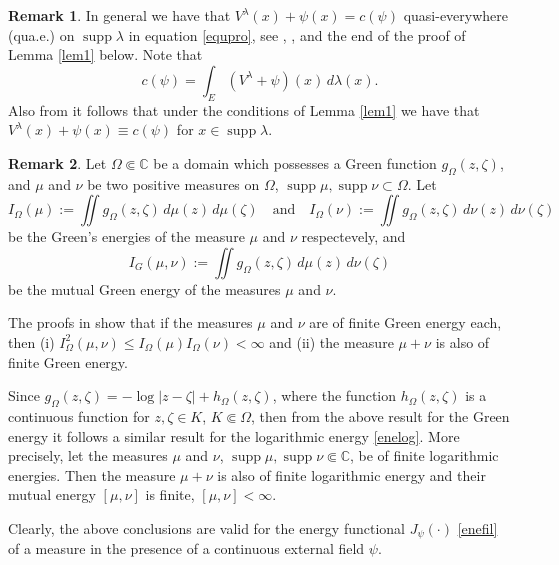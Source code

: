 \documentclass[11pt, a4paper, twoside]{article}
\let\leq\leqslant
\def\CC{\mathbb C}
\def\supp{\operatorname{supp}}
\theoremstyle{plain}
\theoremstyle{definition}
\newtheorem{remark}{Remark}
\begin{document}
\begin{remark}\label{rem21}
In general we have that $V^\lambda(x)+\psi(x)=c(\psi)$ quasi-everywhere (qua.e.) on $\supp{\lambda}$ in equation \eqref{equpro}, see \cite[Chapter 2, \S 4]{Lan66}, \cite[Chapter 5, Section 3]{NiSo88}, \cite[Chapter I, Section I.1]{SaTo97} and  the end of the proof of Lemma \ref{lem1} below.
Note that
\begin{equation}
c(\psi)=\int_E(V^\lambda+\psi)(x)\,d\lambda(x).
\label{cpsifo}
\end{equation}
Also from \cite[Theorem 4.1]{NiSo88} it follows that under the conditions of Lemma \ref{lem1} we have that $V^{\lambda}(x)+\psi(x)\equiv c(\psi)$ for $x\in\supp{\lambda}$.
\end{remark}

\begin{remark}\label{rem22}
Let $\Omega\Subset\CC$ be a domain which possesses a Green function $g_\Omega(z,\zeta)$,
and $\mu$ and $\nu$ be two positive measures on $\Omega$, $\supp{\mu},\supp{\nu}\subset \Omega$. Let 
\begin{equation}
I_\Omega(\mu):=\iint g_\Omega(z,\zeta)\,d\mu(z)\,d\mu(\zeta)\quad
\text{and}\quad 
I_\Omega(\nu):=\iint g_\Omega(z,\zeta)\,d\nu(z)\,d\nu(\zeta)
\label{greenin}
\end{equation}
be the Green's energies of the measure $\mu$ and $\nu$ respectevely, and
\begin{equation}
I_G(\mu,\nu):=\iint  g_\Omega(z,\zeta)\,d\mu(z)\,d\nu(\zeta)
\label{greenmu}
\end{equation}
be the mutual Green energy of the measures $\mu$ and $\nu$. 

The proofs in \cite[Chapter II, Section 5, Lemma 5.4]{SaTo97} show that if the measures $\mu$ and $\nu$ are of finite Green energy each, then (i) $I^2_\Omega(\mu,\nu)\leq I_\Omega(\mu)I_\Omega(\nu)<\infty$  and (ii) the measure $\mu+\nu$ is also of finite Green energy.

Since $g_\Omega(z,\zeta)=-\log|z-\zeta|+h_\Omega(z,\zeta)$, where the function $h_\Omega(z,\zeta)$ is  a continuous function for $z,\zeta\in K$, $K\Subset\Omega$, then from the above result for the Green energy it follows a similar result for the logarithmic energy \eqref{enelog}. More precisely, let the measures $\mu$ and $\nu$, $\supp{\mu},\supp{\nu}\Subset\CC$,  be of finite logarithmic energies. Then the measure $\mu+\nu$ is also of finite logarithmic energy and their mutual energy $[\mu,\nu]$ is finite, $[\mu,\nu]<\infty$.

Clearly, the above  conclusions are valid for the energy functional $J_\psi(\cdot)$ \eqref{enefil} of a measure in the presence of a continuous external field $\psi$.
\end{remark}
\end{document}

